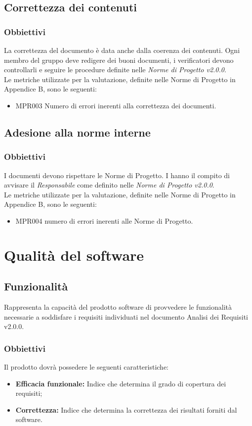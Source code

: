 \subsection{Correttezza dei contenuti}
\subsubsection{Obbiettivi}
La correttezza del documento è data anche dalla coerenza dei contenuti. Ogni membro del gruppo deve redigere dei buoni documenti, i verificatori devono controllarli e seguire le procedure definite nelle \textit{Norme di Progetto v2.0.0}.\\
Le metriche utilizzate per la valutazione, definite nelle Norme di Progetto in Appendice B, sono le seguenti:
\begin{itemize}
	\item MPR003 Numero di errori inerenti alla correttezza dei documenti.
\end{itemize}
\subsection{Adesione alla norme interne}
\subsubsection{Obbiettivi}
I documenti devono rispettare le Norme di Progetto. I  hanno il compito di avvisare il \textit{Responsabile} come definito nelle \textit{Norme di Progetto v2.0.0}.\\
Le metriche utilizzate per la valutazione, definite nelle Norme di Progetto in Appendice B, sono le seguenti:
\begin{itemize}
	\item MPR004 numero di errori inerenti alle Norme di Progetto.
\end{itemize}

\section{Qualità del software}
\label{software}

\subsection{Funzionalità}
Rappresenta la capacità del prodotto software di provvedere le funzionalità necessarie a soddisfare i requisiti individuati nel documento Analisi dei Requisiti v2.0.0. 
\subsubsection{Obbiettivi }Il prodotto dovrà possedere le seguenti caratteristiche:
\begin{itemize}
	\item \textbf{Efficacia funzionale:} Indice che determina il grado di copertura dei requisiti;
	\item \textbf{Correttezza:} Indice che determina la correttezza dei risultati forniti dal software.
\end{itemize}


